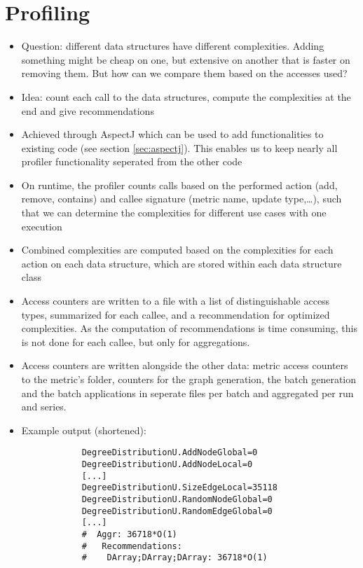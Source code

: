 \section{Profiling}
	\begin{itemize}
		\item Question: different data structures have different complexities. Adding something
			might be cheap on one, but extensive on another that is faster on removing them. But
			how can we compare them based on the accesses used?
		\item Idea: count each call to the data structures, compute the complexities at the
			end and give recommendations
		\item Achieved through AspectJ which can be used to add functionalities to existing code
			(see section \ref{sec:aspectj}). This enables us to keep nearly all profiler
			functionality seperated from the other code
		\item On runtime, the profiler counts calls based on the performed action (add, remove,
			contains) and callee signature (metric name, update type,\ldots), such that we can
			determine the complexities for different use cases with one execution
		\item Combined complexities are computed based on the complexities for each action on
			each data structure, which are stored within each data structure class
		\item Access counters are written to a file with a list of distinguishable access types,
			summarized for each callee, and a recommendation for optimized complexities. As the
			computation of recommendations is time consuming, this is not done for each callee, but
			only for aggregations.
		\item Access counters are written alongside the other data: metric access counters to
			the metric's folder, counters for the graph generation, the batch generation and the
			batch applications in seperate files per batch and aggregated per run and series.
		\item Example output (shortened):
			
		\begin{verbatim}
			DegreeDistributionU.AddNodeGlobal=0
			DegreeDistributionU.AddNodeLocal=0
			[...]
			DegreeDistributionU.SizeEdgeLocal=35118
			DegreeDistributionU.RandomNodeGlobal=0
			DegreeDistributionU.RandomEdgeGlobal=0
			[...]
			#  Aggr: 36718*O(1)
			#   Recommendations:
			#    DArray;DArray;DArray: 36718*O(1)
		\end{verbatim}
		

\end{itemize}
